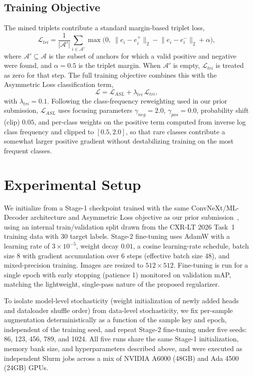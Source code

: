 \documentclass[conference]{IEEEtran}
\begin{document}
\subsection{Training Objective}
The mined triplets contribute a standard margin-based triplet loss,
\begin{equation}
\mathcal{L}_{tri} = \frac{1}{|\mathcal{A}'|}\sum_{i \in \mathcal{A}'} \max\bigl(0,\ \lVert e_i - e_i^{+}\rVert_2 - \lVert e_i - e_i^{-}\rVert_2 + \alpha \bigr),
\label{eq:triplet}
\end{equation}
where $\mathcal{A}'\subseteq\mathcal{A}$ is the subset of anchors for which a valid positive and negative were found, and $\alpha{=}0.5$ is the triplet margin. When $\mathcal{A}'$ is empty, $\mathcal{L}_{tri}$ is treated as zero for that step. The full training objective combines this with the Asymmetric Loss classification term,
\begin{equation}
\mathcal{L} = \mathcal{L}_{ASL} + \lambda_{tri}\,\mathcal{L}_{tri},
\label{eq:total}
\end{equation}
with $\lambda_{tri}{=}0.1$. Following the class-frequency reweighting used in our prior submission, $\mathcal{L}_{ASL}$ uses focusing parameters $\gamma_{neg}{=}2.0$, $\gamma_{pos}{=}0.0$, probability shift (clip) $0.05$, and per-class weights on the positive term computed from inverse log class frequency and clipped to $[0.5, 2.0]$, so that rare classes contribute a somewhat larger positive gradient without destabilizing training on the most frequent classes.

\section{Experimental Setup}
We initialize from a Stage-1 checkpoint trained with the same ConvNeXt/ML-Decoder architecture and Asymmetric Loss objective as our prior submission~\cite{b12}, using an internal train/validation split drawn from the CXR-LT 2026 Task~1 training data with 30 target labels. Stage-2 fine-tuning uses AdamW with a learning rate of $3\times10^{-5}$, weight decay $0.01$, a cosine learning-rate schedule, batch size 8 with gradient accumulation over 6 steps (effective batch size 48), and mixed-precision training. Images are resized to $512\times512$. Fine-tuning is run for a single epoch with early stopping (patience 1) monitored on validation mAP, matching the lightweight, single-pass nature of the proposed regularizer.

To isolate model-level stochasticity (weight initialization of newly added heads and dataloader shuffle order) from data-level stochasticity, we fix per-sample augmentation deterministically as a function of the sample key and epoch, independent of the training seed, and repeat Stage-2 fine-tuning under five seeds: 86, 123, 456, 789, and 1024. All five runs share the same Stage-1 initialization, memory bank size, and hyperparameters described above, and were executed as independent Slurm jobs across a mix of NVIDIA A6000 (48GB) and Ada 4500 (24GB) GPUs.
\end{document}
